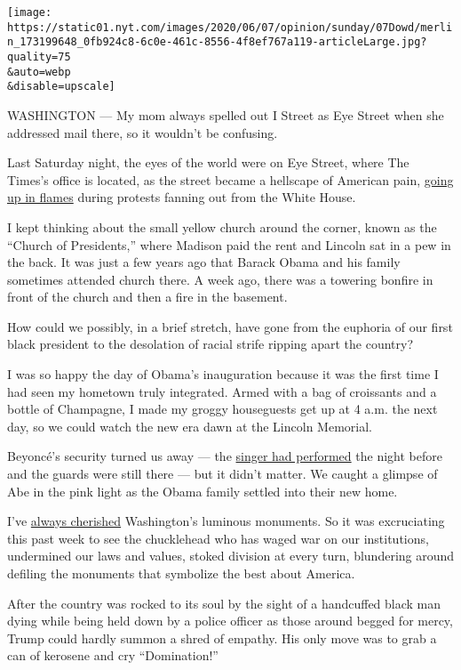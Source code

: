\texttt{[image: https://static01.nyt.com/images/2020/06/07/opinion/sunday/07Dowd/merlin\_173199648\_0fb924c8-6c0e-461c-8556-4f8ef767a119-articleLarge.jpg?quality=75\\\&auto=webp\\\&disable=upscale]}

WASHINGTON --- My mom always spelled out I Street as Eye Street when she
addressed mail there, so it wouldn't be confusing.

Last Saturday night, the eyes of the world were on Eye Street, where The
Times's office is located, as the street became a hellscape of American
pain,
\href{https://www.nytimes.com/2020/05/31/us/politics/washington-dc-george-floyd-protests.html}{going
up in flames} during protests fanning out from the White House.

I kept thinking about the small yellow church around the corner, known
as the ``Church of Presidents,'' where Madison paid the rent and Lincoln
sat in a pew in the back. It was just a few years ago that Barack Obama
and his family sometimes attended church there. A week ago, there was a
towering bonfire in front of the church and then a fire in the basement.

How could we possibly, in a brief stretch, have gone from the euphoria
of our first black president to the desolation of racial strife ripping
apart the country?

I was so happy the day of Obama's inauguration because it was the first
time I had seen my hometown truly integrated. Armed with a bag of
croissants and a bottle of Champagne, I made my groggy houseguests get
up at 4 a.m. the next day, so we could watch the new era dawn at the
Lincoln Memorial.

Beyoncé's security turned us away --- the
\href{https://www.youtube.com/watch?v=yAmydqJmDtY\&t=2s}{singer had
performed} the night before and the guards were still there --- but it
didn't matter. We caught a glimpse of Abe in the pink light as the Obama
family settled into their new home.

I've
\href{https://www.nytimes.com/2001/09/16/magazine/our-correspondent-in-washington-dc-my-memorable-monuments.html}{always
cherished} Washington's luminous monuments. So it was excruciating this
past week to see the chucklehead who has waged war on our institutions,
undermined our laws and values, stoked division at every turn,
blundering around defiling the monuments that symbolize the best about
America.

After the country was rocked to its soul by the sight of a handcuffed
black man dying while being held down by a police officer as those
around begged for mercy, Trump could hardly summon a shred of empathy.
His only move was to grab a can of kerosene and cry ``Domination!''

